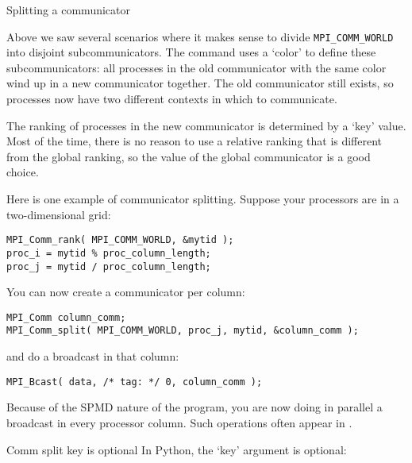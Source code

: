 
 {Splitting a communicator}
\label{sec:comm-split}

Above we saw several scenarios where it makes sense to divide
\lstinline{MPI_COMM_WORLD} into disjoint subcommunicators.
The command  uses a `color' to define
these subcommunicators:
all processes in the old communicator with the same color
wind up in a new communicator together. The old communicator still exists,
so processes now have two different contexts in which to communicate.

The ranking of processes in the new communicator is determined by a `key' value.
Most of the time, there is no reason to use a relative ranking that is different from
the global ranking, so the  value of the global communicator
is a good choice.

Here is one example of communicator splitting. Suppose your processors
are in a two-dimensional grid:
\begin{lstlisting}
MPI_Comm_rank( MPI_COMM_WORLD, &mytid );
proc_i = mytid % proc_column_length;
proc_j = mytid / proc_column_length;
\end{lstlisting}
You can now create a communicator per column:
\begin{lstlisting}
MPI_Comm column_comm;
MPI_Comm_split( MPI_COMM_WORLD, proc_j, mytid, &column_comm );
\end{lstlisting}
and do a broadcast in that column:
\begin{lstlisting}
MPI_Bcast( data, /* tag: */ 0, column_comm );
\end{lstlisting}
Because of the SPMD nature of the program, you are now doing in parallel
a broadcast in every processor column. Such operations often appear
in .

\begin{pythonnote}{Comm split key is optional}
  In Python, the `key' argument is optional:
\end{pythonnote}

